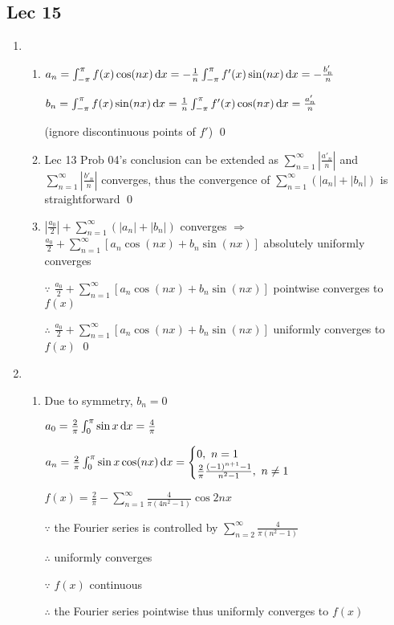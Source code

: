 \subsection{Lec 15}
    \begin{enumerate}[1]
    \item
        \begin{enumerate}[(1)]
        \item
        $a_n = \int_{-\pi}^{\pi} f(x) \cos (nx)\dif x=-\frac{1}{n}\int_{-\pi}^{\pi} f'(x)\sin (nx)\dif x = -\frac{b'_n}{n} $
        \par $b_n =\int_{-\pi}^{\pi} f(x) \sin (nx)\dif x=\frac{1}{n}\int_{-\pi}^{\pi} f'(x)\cos (nx)\dif x = \frac{a'_n}{n}$ 
        \par (ignore discontinuous points of $f'$) \qed
        
        \item
        Lec 13 Prob 04's conclusion can be extended as $\sum\limits_{n=1}^\infty \left|\frac{a'_n}{n}\right|$ and $\sum\limits_{n=1}^\infty \left|\frac{b'_n}{n}\right|$ converges, thus the convergence of $\sum\limits_{n=1}^\infty (|a_n|+|b_n|)$ is straightforward \qed
        
        \item
        $|\frac{a_0}{2}|+\sum\limits_{n=1}^\infty (|a_n|+|b_n|)$ converges $\Rightarrow$ $\frac{a_0}{2}+\sum\limits_{n=1}^\infty [a_n\cos (nx)+b_n\sin (nx)]$ absolutely uniformly converges
        \par $\because$ $\frac{a_0}{2}+\sum\limits_{n=1}^\infty [a_n\cos (nx)+b_n\sin (nx)]$ pointwise converges to $f(x)$
        \par $\therefore$ $\frac{a_0}{2}+\sum\limits_{n=1}^\infty [a_n\cos (nx)+b_n\sin (nx)]$ uniformly converges to $f(x)$ \qed
        \end{enumerate}
    
    
    \item
        \begin{enumerate}[(1)]
        \item
        Due to symmetry, $b_n=0$
        \par $ a_0 = \frac{2}{\pi} \int_{0}^{\pi} \sin x \dif x = \frac{4
        }{\pi} $
        \par $a_n=\frac{2}{\pi} \int_{0}^{\pi} \sin x\cos (nx) \dif x=\begin{cases}0,\ n=1\\\frac{2}{\pi}\frac{(-1)^{n+1}-1}{n^2-1},\ n\neq 1\end{cases}$
        \par $ f(x)= \frac{2}{\pi} - \sum\limits_{n=1}^\infty \frac{4}{\pi (4n^2-1)} \cos 2nx $
        \par $\because$ the Fourier series is controlled by $\sum\limits_{n=2}^\infty \frac{4}{\pi(n^2-1)}$
        \par $\therefore$ uniformly converges
        \par $\because$ $f(x)$ continuous
        \par $\therefore$ the Fourier series pointwise thus uniformly converges to $f(x)$
        

\end{enumerate}
\end{enumerate}
